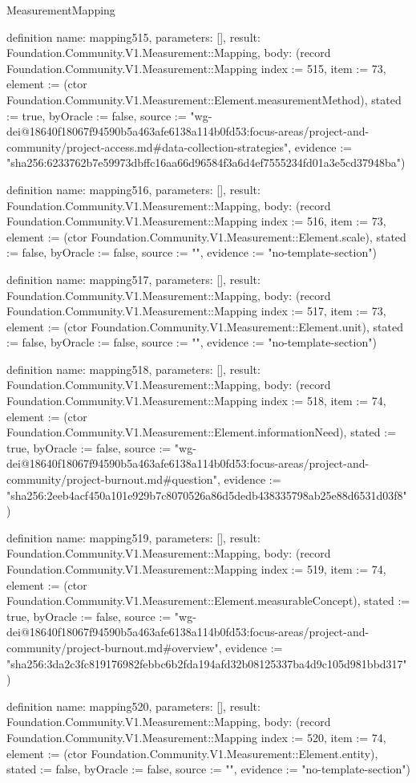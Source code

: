 \begin{lexlean}{MeasurementMapping}
\begin{semanticmodule}
definition{
  name: mapping515,
  parameters: [],
  result: Foundation.Community.V1.Measurement::Mapping,
  body: (record Foundation.Community.V1.Measurement::Mapping {index := 515, item := 73, element := (ctor Foundation.Community.V1.Measurement::Element.measurementMethod), stated := true, byOracle := false, source := "wg-dei@18640f18067f94590b5a463afe6138a114b0fd53:focus-areas/project-and-community/project-access.md#data-collection-strategies", evidence := "sha256:6233762b7e59973dbffc16aa66d96584f3a6d4ef7555234fd01a3e5cd37948ba"})
}

definition{
  name: mapping516,
  parameters: [],
  result: Foundation.Community.V1.Measurement::Mapping,
  body: (record Foundation.Community.V1.Measurement::Mapping {index := 516, item := 73, element := (ctor Foundation.Community.V1.Measurement::Element.scale), stated := false, byOracle := false, source := "", evidence := "no-template-section"})
}

definition{
  name: mapping517,
  parameters: [],
  result: Foundation.Community.V1.Measurement::Mapping,
  body: (record Foundation.Community.V1.Measurement::Mapping {index := 517, item := 73, element := (ctor Foundation.Community.V1.Measurement::Element.unit), stated := false, byOracle := false, source := "", evidence := "no-template-section"})
}

definition{
  name: mapping518,
  parameters: [],
  result: Foundation.Community.V1.Measurement::Mapping,
  body: (record Foundation.Community.V1.Measurement::Mapping {index := 518, item := 74, element := (ctor Foundation.Community.V1.Measurement::Element.informationNeed), stated := true, byOracle := false, source := "wg-dei@18640f18067f94590b5a463afe6138a114b0fd53:focus-areas/project-and-community/project-burnout.md#question", evidence := "sha256:2eeb4acf450a101e929b7c8070526a86d5dedb438335798ab25e88d6531d03f8"})
}

definition{
  name: mapping519,
  parameters: [],
  result: Foundation.Community.V1.Measurement::Mapping,
  body: (record Foundation.Community.V1.Measurement::Mapping {index := 519, item := 74, element := (ctor Foundation.Community.V1.Measurement::Element.measurableConcept), stated := true, byOracle := false, source := "wg-dei@18640f18067f94590b5a463afe6138a114b0fd53:focus-areas/project-and-community/project-burnout.md#overview", evidence := "sha256:3da2c3fc819176982febbc6b2fda194afd32b08125337ba4d9c105d981bbd317"})
}

definition{
  name: mapping520,
  parameters: [],
  result: Foundation.Community.V1.Measurement::Mapping,
  body: (record Foundation.Community.V1.Measurement::Mapping {index := 520, item := 74, element := (ctor Foundation.Community.V1.Measurement::Element.entity), stated := false, byOracle := false, source := "", evidence := "no-template-section"})
}


\end{semanticmodule}
\end{lexlean}
